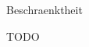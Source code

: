 \documentclass[class=article, crop=false]{standalone}
\begin{document}
\begin{zettel}{Beschraenktheit}
\begin{flashcard}
    TODO
\end{flashcard}
\end{zettel}
\end{document}
